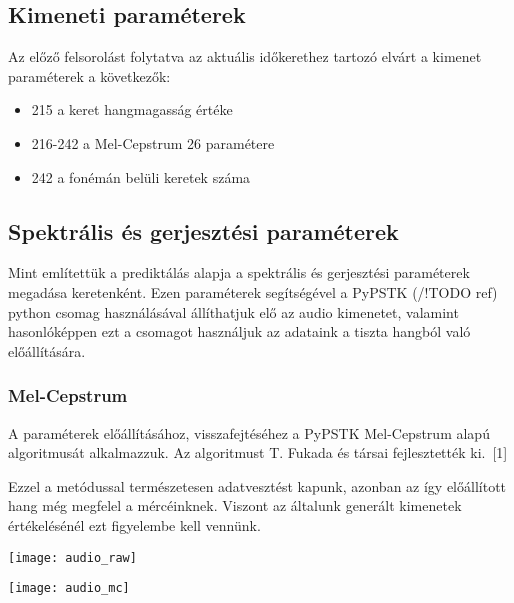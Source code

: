 \subsection{Kimeneti paraméterek}
Az előző felsorolást folytatva az aktuális időkerethez tartozó elvárt a kimenet paraméterek a következők:

 
\begin{itemize}
	\item 215 a keret hangmagasság értéke
	\item 216-242 a Mel-Cepstrum 26 paramétere
	\item 242 a fonémán belüli keretek száma
\end{itemize}
\subsection{Spektrális és gerjesztési paraméterek}
Mint említettük a prediktálás alapja a spektrális és gerjesztési paraméterek megadása keretenként. Ezen paraméterek segítségével a PyPSTK (/!TODO ref) python csomag használásával állíthatjuk elő az audio kimenetet, valamint hasonlóképpen ezt a csomagot használjuk az adataink a tiszta hangból való előállítására.
\subsubsection{Mel-Cepstrum}
A paraméterek előállításához, visszafejtéséhez a PyPSTK Mel-Cepstrum alapú algoritmusát alkalmazzuk. Az algoritmust T. Fukada és társai fejlesztették ki.\ [1]

Ezzel a metódussal természetesen adatvesztést kapunk, azonban az így előállított hang még megfelel a mércéinknek. Viszont az általunk generált kimenetek értékelésénél ezt figyelembe kell vennünk.

\texttt{[image: audio\_raw]}

\texttt{[image: audio\_mc]}